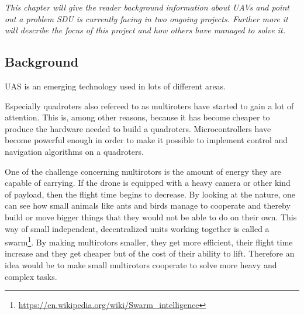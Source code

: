 \textit{This chapter will give the reader background information about UAVs and point out a problem SDU is currently facing in two ongoing projects. Further more it will describe the focus of this project and how others have managed to solve it.}
\subsection*{Background}
UAS is an emerging technology used in lots of different areas\cite{gupta2013review}.

Especially quadroters also refereed to as multiroters have started to gain a lot of attention. This is, among other reasons, because it has become cheaper to produce the hardware needed to build a quadroters. Microcontrollers have become powerful enough in order to make it possible to implement control and navigation algorithms on a quadroters.\cite{gibiansky2010quadcopter}


One of the challenge concerning multirotors is the amount of energy they are capable of carrying. If the drone is equipped with a heavy camera or other kind of payload, then the flight time begins to decrease. 
By looking at the nature, one can see how small animals like ants and birds manage to cooperate and thereby build or move bigger things that they would not be able to do on their own. This way of small independent, decentralized units working together is called a swarm\footnote{\url{https://en.wikipedia.org/wiki/Swarm\_intelligence}}.
By making multirotors smaller, they get more efficient, their flight time increase and they get cheaper but of the cost of their ability to lift\cite{1_kumar_2016}. Therefore an idea would be to make small multirotors cooperate to solve more heavy and complex tasks. 

